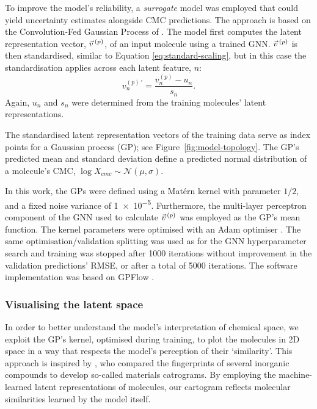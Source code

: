 To improve the model's reliability, a \emph{surrogate} model was employed that could yield uncertainty estimates alongside CMC predictions. The approach is based on the Convolution-Fed Gaussian Process of \citet{tranMethodsComparingUncertainty2020}. The model first computes the latent representation vector, $\vec{v}^{\,(p)}{}$, of an input molecule using a trained GNN. $\vec{v}^{\,(p)}{}$ is then standardised, similar to Equation \ref{eq:standard-scaling},
but in this case the standardisation applies across each latent feature, $n$:
\begin{equation}
    v^{(p)\,\prime}_n = \frac{v^{(p)}_n - u_n}{s_n}.
\end{equation}
Again, $u_n$ and $s_n$ were determined from the training molecules' latent representations.

The standardised latent representation vectors of the training data serve as index points for a Gaussian process (GP); see Figure~\ref{fig:model-topology}.
The GP's predicted mean and standard deviation define a predicted normal distribution of a molecule's CMC, $\log X_{cmc} \sim \mathcal{N}(\mu, \sigma)$.

In this work, the GPs  were defined using a Mat\'ern kernel with parameter
$1/2$, and a fixed noise variance of \num{1e-5}. Furthermore, the multi-layer
perceptron component of the GNN used to calculate $\vec{v}^{\,(p)}{}$ was employed as the
GP's mean function. The kernel parameters were optimised with an Adam optimiser
\cite{kingmaAdamMethodStochastic2017}. The same optimisation/validation
splitting was used as for the GNN hyperparameter search and training was stopped
after \num{1000} iterations without improvement in the validation predictions'
RMSE, or after a total of \num{5000} iterations. The software implementation was
based on GPFlow \cite{matthewsGPflowGaussianProcess2017}.

\subsubsection{Visualising the latent space}

In order to better understand the model's interpretation of chemical space, we
exploit the GP's kernel, optimised during training, to plot the molecules in 2D
space in a way that respects the model's perception of their `similarity'. This
approach is inspired by \citet{isayevMaterialsCartographyRepresenting2015}, who
compared the fingerprints of several inorganic compounds to develop so-called
materials catrograms. By employing the machine-learned latent representations of
molecules, our cartogram reflects molecular similarities learned by the model
itself.

